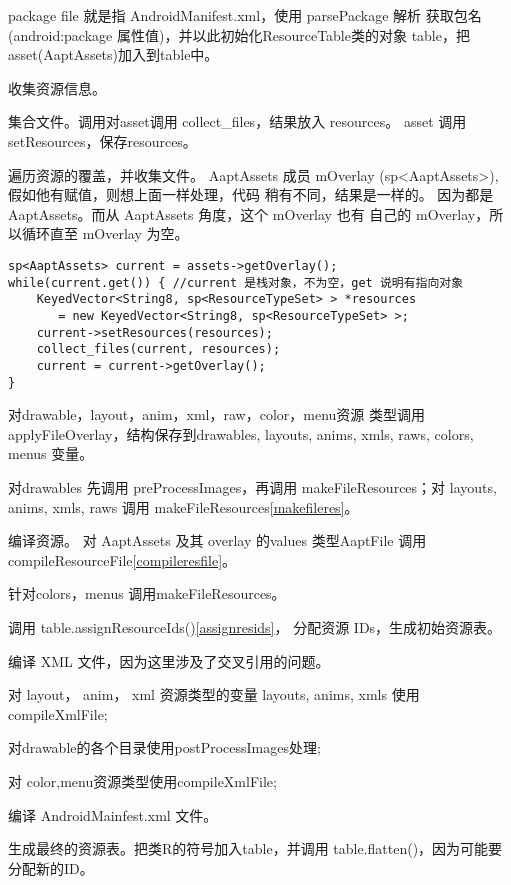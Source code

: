 \documentclass[a4paper,11pt]{article}
\begin{document}
\begin{itemize*}
    \item package file 就是指 AndroidManifest.xml，使用 parsePackage 解析
        获取包名(android:package 属性值)，并以此初始化ResourceTable类的对象
        table\label{initresourcetbl}，把asset(AaptAssets)加入到table中。
    \item 收集资源信息。
        \begin{itemize*}
            \item 集合文件。调用对asset调用 collect_files，结果放入 resources。
                asset 调用 setResources，保存resources。
            \item 遍历资源的覆盖，并收集文件。 AaptAssets 成员
                  mOverlay (sp<AaptAssets>), 假如他有赋值，则想上面一样处理，代码
                  稍有不同，结果是一样的。
                 因为都是 AaptAssets。而从 AaptAssets 角度，这个 mOverlay 也有
                 自己的 mOverlay，所以循环直至 mOverlay 为空。
\begin{lstlisting}
sp<AaptAssets> current = assets->getOverlay();
while(current.get()) { //current 是栈对象，不为空，get 说明有指向对象
    KeyedVector<String8, sp<ResourceTypeSet> > *resources 
       = new KeyedVector<String8, sp<ResourceTypeSet> >;
    current->setResources(resources);
    collect_files(current, resources);
    current = current->getOverlay();
}
\end{lstlisting}
            \item 对drawable，layout，anim，xml，raw，color，menu资源
                  类型调用applyFileOverlay，结构保存到drawables, 
                  layouts, anims, xmls, raws, colors, menus 变量。
            \item 对drawables 先调用 preProcessImages，再调用 
                  makeFileResources；对 layouts, anims, xmls, raws 
                  调用 makeFileResources\cref{makefileres}。
            \item 编译资源。 对 AaptAssets 及其 overlay 的values 类型AaptFile
                  调用compileResourceFile\cref{compileresfile}。
            \item 针对colors，menus 调用makeFileResources。

        \end{itemize*}

     \item  调用 table.assignResourceIds()\cref{assignresids}， 分配资源 IDs，生成初始资源表。
     \item  编译 XML 文件，因为这里涉及了交叉引用的问题。
        \begin{itemize*}
            \item 对 layout， anim， xml 资源类型的变量 layouts, anims, xmls
            使用compileXmlFile; 
            \item 对drawable的各个目录使用postProcessImages处理;
            \item 对 color,menu资源类型使用compileXmlFile;
            \item 编译 AndroidMainfest.xml 文件。
        \end{itemize*}
    \item 生成最终的资源表。把类R的符号加入table，并调用
        table.flatten()，因为可能要分配新的ID。 
\end{itemize*}
\end{document}

